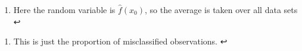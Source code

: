 \documentclass[11pt]{article}
\providecommand{\tightlist}{%
      \setlength{\itemsep}{0pt}\setlength{\parskip}{0pt}}
\begin{document}
\hypertarget{foot5}{}
\begin{enumerate}
\def\labelenumi{\arabic{enumi}.}
\setcounter{enumi}{4}
\tightlist
\item
  Here the random variable is \(\hat{f}(x_0)\), so the average is taken
  over all data sets ↩
\end{enumerate}

\hypertarget{foot6}{}
\begin{enumerate}
\def\labelenumi{\arabic{enumi}.}
\setcounter{enumi}{5}
\tightlist
\item
  This is just the proportion of misclassified observations. ↩
\end{enumerate}


    
    
    
    
\end{document}

